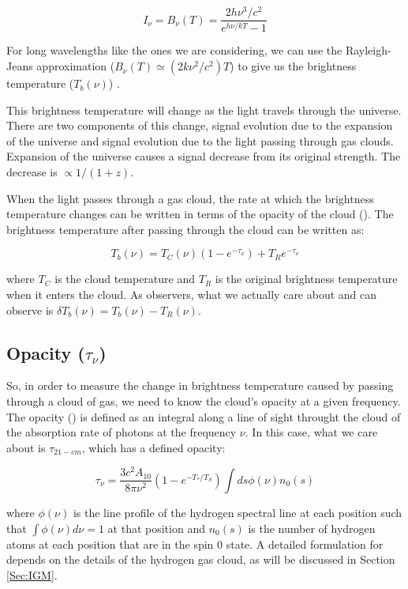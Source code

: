 \begin{equation}
I_{\nu} = B_{\nu}(T) = \frac{ 2 h \nu^3 / c^2}{e^{h \nu / k T}-1}
\end{equation}

For long wavelengths like the ones we are considering, we can use the Rayleigh-Jeans approximation ($B_{\nu} (T) \simeq (2 k \nu^2 / c^2) T$) to give us the brightness temperature ($T_b (\nu)$) \cite{carroll2007}. 

This brightness temperature will change as the light travels through the universe. There are two components of this change, signal evolution due to the expansion of the universe and signal evolution due to the light passing through gas clouds. Expansion of the universe causes a signal decrease from its original strength. The decrease is $\propto 1/(1+z)$. 

When the light passes through a gas cloud, the rate at which the brightness temperature changes can be written in terms of the opacity of the cloud (\tu). The brightness temperature after passing through the cloud can be written as:

\begin{equation}
T_b (\nu) = T_{C} (\nu) (1-e^{-\tau_\nu}) +T_{R} e^{-\tau_\nu}
\end{equation}

where $T_{C}$ is the cloud temperature and $T_{R}$ is the original brightness temperature when it enters the cloud. As observers, what we actually care about and can observe is $\delta T_b (\nu) = T_b (\nu) - T_R  (\nu)$. 

\subsection{Opacity ($\tau_\nu$)}
So, in order to measure the change in brightness temperature caused by passing through a cloud of gas, we need to know the cloud's opacity at a given frequency. The opacity (\tu) is defined as an integral along a line of sight throught the cloud of the absorption rate of photons at the frequency $\nu$. In this case, what we care about is $\tau_{21-cm}$, which has a defined opacity:

\begin{equation}
\tau_{\nu} = \frac{3 c^2 A_{10}}{8 \pi \nu^2 } (1-e^{-T_*/T_S}) \int ds \phi (\nu) n_0(s)
\end{equation}

where $\phi (\nu)$ is the line profile of the hydrogen \cm spectral line at each position such that $\int \phi(\nu) d \nu = 1$ at that position and $n_0 (s)$ is the number of hydrogen atoms at each position that are in the spin 0 state. A detailed formulation for \tu depends on the details of the hydrogen gas cloud, as will be discussed in Section \ref{Sec:IGM}. 


